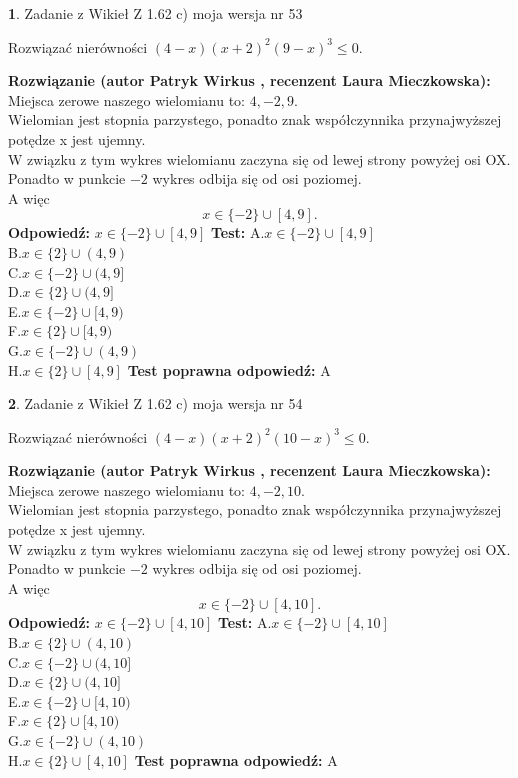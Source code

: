 \documentclass[12pt, a4paper]{article}
\theoremstyle{definition} %
\newtheorem{zad}{}
\newcommand{\zadStart}[1]{\begin{zad}#1\newline}
\newcommand{\zadStop}{\end{zad}}
\newcommand{\rozwStart}[2]{\noindent \textbf{Rozwiązanie (autor #1 , recenzent #2): }\newline}
\newcommand{\rozwStop}{\newline}
\newcommand{\odpStart}{\noindent \textbf{Odpowiedź:}\newline}
\newcommand{\odpStop}{\newline}
\newcommand{\testStart}{\noindent \textbf{Test:}\newline}
\newcommand{\testStop}{\newline}
\newcommand{\kluczStart}{\noindent \textbf{Test poprawna odpowiedź:}\newline}
\newcommand{\kluczStop}{\newline}
\begin{document}
\zadStart{Zadanie z Wikieł Z 1.62 c) moja wersja nr 53}

Rozwiązać nierówności $(4-x)(x+2)^{2}(9-x)^{3}\le0$.
\zadStop
\rozwStart{Patryk Wirkus}{Laura Mieczkowska}
Miejsca zerowe naszego wielomianu to: $4, -2, 9$.\\
Wielomian jest stopnia parzystego, ponadto znak współczynnika przy\linebreak najwyższej potędze x jest ujemny.\\ W związku z tym wykres wielomianu zaczyna się od lewej strony powyżej osi OX.\\
Ponadto w punkcie $-2$ wykres odbija się od osi poziomej.\\
A więc $$x \in \{-2\} \cup [4,9].$$
\rozwStop
\odpStart
$x \in \{-2\} \cup [4,9]$
\odpStop
\testStart
A.$x \in \{-2\} \cup [4,9]$\\
B.$x \in \{2\} \cup (4,9)$\\
C.$x \in \{-2\} \cup (4,9]$\\
D.$x \in \{2\} \cup (4,9]$\\
E.$x \in \{-2\} \cup [4,9)$\\
F.$x \in \{2\} \cup [4,9)$\\
G.$x \in \{-2\} \cup (4,9)$\\
H.$x \in \{2\} \cup [4,9]$
\testStop
\kluczStart
A
\kluczStop



\zadStart{Zadanie z Wikieł Z 1.62 c) moja wersja nr 54}

Rozwiązać nierówności $(4-x)(x+2)^{2}(10-x)^{3}\le0$.
\zadStop
\rozwStart{Patryk Wirkus}{Laura Mieczkowska}
Miejsca zerowe naszego wielomianu to: $4, -2, 10$.\\
Wielomian jest stopnia parzystego, ponadto znak współczynnika przy\linebreak najwyższej potędze x jest ujemny.\\ W związku z tym wykres wielomianu zaczyna się od lewej strony powyżej osi OX.\\
Ponadto w punkcie $-2$ wykres odbija się od osi poziomej.\\
A więc $$x \in \{-2\} \cup [4,10].$$
\rozwStop
\odpStart
$x \in \{-2\} \cup [4,10]$
\odpStop
\testStart
A.$x \in \{-2\} \cup [4,10]$\\
B.$x \in \{2\} \cup (4,10)$\\
C.$x \in \{-2\} \cup (4,10]$\\
D.$x \in \{2\} \cup (4,10]$\\
E.$x \in \{-2\} \cup [4,10)$\\
F.$x \in \{2\} \cup [4,10)$\\
G.$x \in \{-2\} \cup (4,10)$\\
H.$x \in \{2\} \cup [4,10]$
\testStop
\kluczStart
A
\kluczStop
\end{document}
